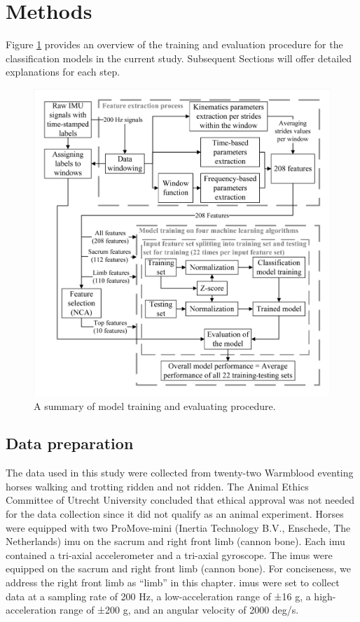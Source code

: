 \section{Methods}
\label{sec:methods}

Figure \ref{rider_system} provides an overview of the training and evaluation procedure for the classification models in the current study. Subsequent Sections will offer detailed explanations for each step.

\begin{figure}[htbp]
\centering
\includegraphics[width=\linewidth]{chapters/rider/figures/system.jpg}
\caption{A summary of model training and evaluating procedure.}
\label{rider_system}
\end{figure}

\subsection{Data preparation}
\label{subsec:data}
The data used in this study were collected from twenty-two Warmblood eventing horses walking and trotting ridden and not ridden. The Animal Ethics Committee of Utrecht University concluded that ethical approval was not needed for the data collection since it did not qualify as an animal experiment. Horses were equipped with two ProMove-mini  (Inertia Technology B.V., Enschede, The Netherlands) \gls{imu} on the sacrum and right front limb (cannon bone). Each \gls{imu} contained a tri-axial accelerometer and a tri-axial gyroscope. The \gls{imu}s were equipped on the sacrum and right front limb (cannon bone). For conciseness, we address the right front limb as “limb” in this chapter. \gls{imu}s were set to collect data at a sampling rate of 200 Hz, a low-acceleration range of ±16 g, a high-acceleration range of ±200 g, and an angular velocity of 2000 deg/s. 

